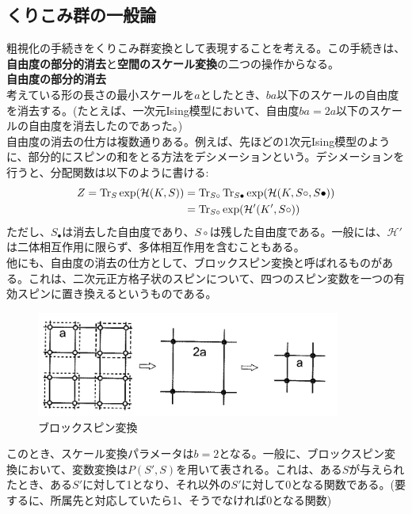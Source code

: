 \documentclass[a4paper,11pt]{jsarticle}
\numberwithin{equation}{section}
\begin{document}
\subsection{くりこみ群の一般論}
粗視化の手続きをくりこみ群変換として表現することを考える。この手続きは、\textbf{自由度の部分的消去}と\textbf{空間のスケール変換}の二つの操作からなる。\\

\textbf{自由度の部分的消去}\\
考えている形の長さの最小スケールを$a$としたとき、$ba$以下のスケールの自由度を消去する。(たとえば、一次元Ising模型において、自由度$ba = 2a$以下のスケールの自由度を消去したのであった。)\\
自由度の消去の仕方は複数通りある。例えば、先ほどの1次元Ising模型のように、部分的にスピンの和をとる方法をデシメーションという。デシメーションを行うと、分配関数は以下のように書ける:
\begin{align}
    Z = \Tr_S \exp(\mathcal{H}(K,S)) &= \Tr_{S\circ} \Tr_{S\bullet} \exp(\mathcal{H}(K,S\circ, S\bullet))\\
    &= \Tr_{S\circ} \exp(\mathcal{H}'(K',S\circ))
\end{align}
ただし、$S_\bullet$は消去した自由度であり、$S\circ$は残した自由度である。一般には、$\mathcal{H}'$は二体相互作用に限らず、多体相互作用を含むこともある。\\
他にも、自由度の消去の仕方として、ブロックスピン変換と呼ばれるものがある。これは、二次元正方格子状のスピンについて、四つのスピン変数を一つの有効スピンに置き換えるというものである。\\
\begin{figure}[H]
    \begin{center}
    \includegraphics[width=100mm]{spin.png}
    \end{center}
    \caption{ブロックスピン変換}
    \label{fig:spin}
\end{figure}
このとき、スケール変換パラメータは$b=2$となる。一般に、ブロックスピン変換において、変数変換は$P(S',S)$を用いて表される。これは、ある$S$が与えられたとき、ある$S'$に対して1となり、それ以外の$S'$に対して0となる関数である。(要するに、所属先と対応していたら1、そうでなければ0となる関数)
\end{document}
